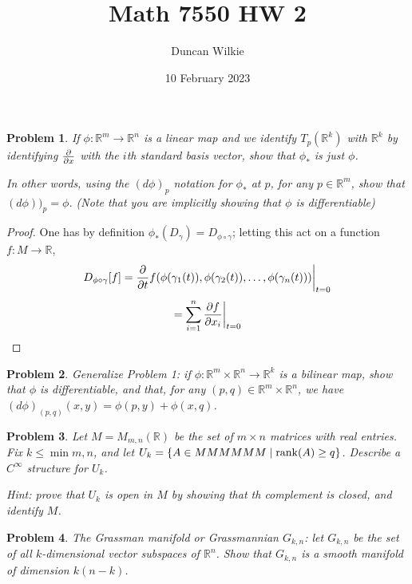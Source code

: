 \documentclass{article}
\title{Math 7550 HW 2}
\author{Duncan Wilkie}
\date{10 February 2023}
\newtheorem{plm}{Problem}
\begin{document}
\maketitle

\begin{plm}
  If $\phi: \mathbb{R}^{m} \to \mathbb{R}^{n}$ is a linear map and we identify $T_{p}(\mathbb{R}^{k})$ with $\mathbb{R}^{k}$
  by identifying $\pdv{x}$ with the $i$th standard basis vector, show that $\phi_{*}$ is just $\phi$.

  In other words, using the $(d\phi)_{p}$ notation for $\phi_{*}$ at $p$, for any $p \in \mathbb{R}^{m}$, show that $(d\phi))_{p} = \phi$.
  (Note that you are implicitly showing that $\phi$ is differentiable)
\end{plm}

\begin{proof}
  One has by definition $\phi_{*}(D_{\gamma}) = D_{\phi \circ \gamma}$; letting this act on a function $f: M \to \mathbb{R}$,
  \[
    D_{\phi \circ \gamma}[f] = \pdv{t}f(\phi(\gamma_{1}(t)), \phi(\gamma_{2}(t)), \ldots, \phi(\gamma_{n}(t)))\bigg|_{t = 0}
  \]
  \[
    = \sum_{i = 1}^{n} \pdv{f}{x_{i}}\bigg|_{t = 0}
  \]

\end{proof}

\begin{plm}
  Generalize Problem 1: if $\phi: \mathbb{R}^{m} \times \mathbb{R}^{n} \to \mathbb{R}^{k}$ is a bilinear map, show that $\phi$ is differentiable,
  and that, for any $(p, q) \in \mathbb{R}^{m} \times \mathbb{R}^{n}$, we have $(d\phi)_{(p,q)}(x,  y) = \phi(p, y) + \phi(x, q)$.
\end{plm}

\begin{plm}
  Let $M = M_{m,n}(\mathbb{R})$ be the set of $m \times n$ matrices with real entries.
  Fix $k \leq \min{m,  n}$, and let $U_{k} = \{A \in MMMMMM \mid \rank(A) \geq q\}$.
  Describe a $C^{\infty}$ structure for $U_{k}$.

  Hint: prove that $U_{k}$ is open in $M$ by showing that th complement is closed, and identify $M$.
\end{plm}

\begin{plm}
  The Grassman manifold or Grassmannian $G_{k,n}$: let $G_{k,n}$ be the set of all $k$-dimensional vector subspaces of $\mathbb{R}^{n}$.
  Show that $G_{k,n}$ is a smooth manifold of dimension $k(n - k)$.

\end{plm}
\end{document}
